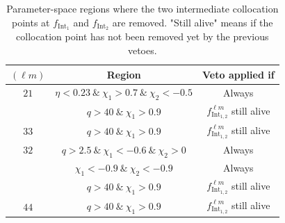 \documentclass[twocolumn,prd,aps,superscriptaddress,preprintnumbers,tightenlines,showpacs,nofootinbib,eqsecnum,amsfonts,amsmath]{revtex4}
\begin{document}
\begin{table}[h!]
\caption{Parameter-space regions where the two intermediate collocation points at $f_{\mathrm{Int_1}}$ and $f_{\mathrm{Int_2}}$ are removed. "Still alive" means if the collocation point has not been removed yet by the previous vetoes.}
\label{tab:inter_veto}
\begin{center}
\begin{tabular}{| c | c | c |}
\hline
$(\ell m)$ &  Region   &   Veto applied if   \\  
\hline                        
$21$ & $\eta<0.23 ~\&~ \chi_1>0.7 ~\&~ \chi_2<-0.5$       & Always \\
     & $q>40 ~\&~ \chi_1>0.9$                         & $f_\mathrm{Int_{1,2}}^{\ell m}$ still alive  \\
\hline
$33$ & $q>40  ~\&~ \chi_1>0.9$                         & $f_\mathrm{Int_{1,2}}^{\ell m}$ still alive \\
\hline
$32$ & $q>2.5  ~\&~ \chi_1<-0.6  ~\&~\chi_2>0$               & Always \\
     & $\chi_1<-0.9 ~\&~\chi_2<-0.9$                  & Always \\ 
     & $q>40 ~\&~ \chi_1>0.9$                         & $f_\mathrm{Int_{1,2}}^{\ell m}$ still alive \\  
\hline
$44$ & $q>40 ~\&~ \chi_1>0.9$                         & $f_\mathrm{Int_{1,2}}^{\ell m}$ still alive\\ 
\hline
\end{tabular}
\end{center}
\end{table}
\end{document}
